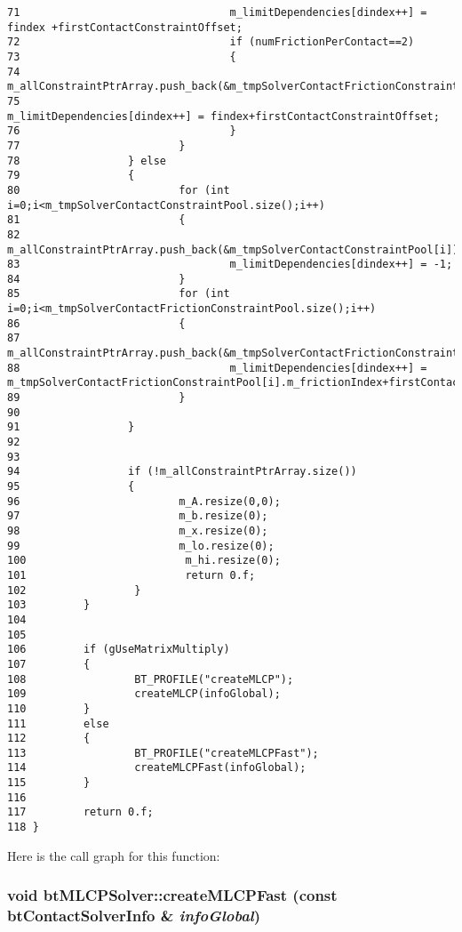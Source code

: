 \begin{Code}
\begin{verbatim}
71                                 m_limitDependencies[dindex++] = findex +firstContactConstraintOffset;
72                                 if (numFrictionPerContact==2)
73                                 {
74                                         m_allConstraintPtrArray.push_back(&m_tmpSolverContactFrictionConstraintPool[i*numFrictionPerContact+1]);
75                                         m_limitDependencies[dindex++] = findex+firstContactConstraintOffset;
76                                 }
77                         }
78                 } else
79                 {
80                         for (int i=0;i<m_tmpSolverContactConstraintPool.size();i++)
81                         {
82                                 m_allConstraintPtrArray.push_back(&m_tmpSolverContactConstraintPool[i]);
83                                 m_limitDependencies[dindex++] = -1;
84                         }
85                         for (int i=0;i<m_tmpSolverContactFrictionConstraintPool.size();i++)
86                         {
87                                 m_allConstraintPtrArray.push_back(&m_tmpSolverContactFrictionConstraintPool[i]);
88                                 m_limitDependencies[dindex++] = m_tmpSolverContactFrictionConstraintPool[i].m_frictionIndex+firstContactConstraintOffset;
89                         }
90                         
91                 }
92 
93 
94                 if (!m_allConstraintPtrArray.size())
95                 {
96                         m_A.resize(0,0);
97                         m_b.resize(0);
98                         m_x.resize(0);
99                         m_lo.resize(0);
100                         m_hi.resize(0);
101                         return 0.f;
102                 }
103         }
104 
105         
106         if (gUseMatrixMultiply)
107         {
108                 BT_PROFILE("createMLCP");
109                 createMLCP(infoGlobal);
110         }
111         else
112         {
113                 BT_PROFILE("createMLCPFast");
114                 createMLCPFast(infoGlobal);
115         }
116 
117         return 0.f;
118 }
\end{verbatim}
\end{Code}




Here is the call graph for this function:\hypertarget{classbt_m_l_c_p_solver_b36b9b3bf2bbbd1de7db27ba109e0a8a}{
\subsubsection[createMLCPFast]{\setlength{\rightskip}{0pt plus 5cm}void btMLCPSolver::createMLCPFast (const btContactSolverInfo \& {\em infoGlobal})}}
\label{classbt_m_l_c_p_solver_b36b9b3bf2bbbd1de7db27ba109e0a8a}





